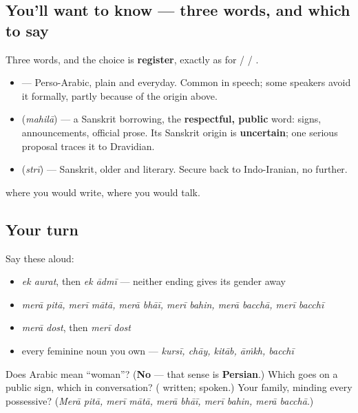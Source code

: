 \subsection*{You'll want to know — three words, and which to say}
Three words, and the choice is \textbf{register}, exactly as for \textbf{} / \textbf{} / \textbf{}.

\begin{itemize}
\raggedright
  \item \textbf{} — Perso-Arabic, plain and everyday. Common in speech; some speakers avoid it formally, partly because of the origin above.
  \item \textbf{} (\emph{mahilā}) — a Sanskrit borrowing, the \textbf{respectful, public} word: signs, announcements, official prose. Its Sanskrit origin is \textbf{uncertain}; one serious proposal traces it to Dravidian.
  \item \textbf{} (\emph{strī}) — Sanskrit, older and literary. Secure back to Indo-Iranian, no further.
\end{itemize}

\textbf{} where you would write, \textbf{} where you would talk.

\subsection*{Your turn}
Say these aloud:

\begin{itemize}
\raggedright
  \item \emph{ek aurat}, then \emph{ek ādmī} — neither ending gives its gender away
  \item \emph{merā pitā, merī mātā, merā bhāī, merī bahin, merā bacchā, merī bacchī}
  \item \emph{merā dost}, then \emph{merī dost}
  \item every feminine noun you own — \emph{kursī, chāy, kitāb, āṁkh, bacchī}
\end{itemize}

\begin{tcolorbox}[breakable,colback=teal!4,colframe=teal!35!black,title={Before you move on}]
Does Arabic \textbf{} mean \textquotedblleft{}woman\textquotedblright{}? (\textbf{No} — that sense is \textbf{Persian}.) Which goes on a public sign, which in conversation? (\textbf{} written; \textbf{} spoken.) Your family, minding every possessive? (\emph{Merā pitā, merī mātā, merā bhāī, merī bahin, merā bacchā}.)
\end{tcolorbox}
